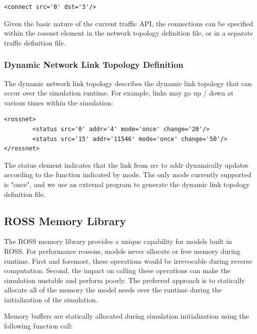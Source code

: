 \documentclass[12pt]{article}
\begin{document}
\begin{small}
\begin{verbatim}
<connect src='0' dst='3'/>
\end{verbatim}
\end{small}

Given the basic nature of the current traffic API, the connections can be
specified within the rossnet element in the network topology definition file,
or in a separate traffic definition file.

\subsubsection{Dynamic Network Link Topology Definition}

The dynamic network link topology describes the dynamic link topology that can
occur over the simulation runtime.  For example, links may go up / down at
various times within the simulation:

\begin{small}
\begin{verbatim}
<rossnet>
        <status src='0' addr='4' mode='once' change='20'/>
        <status src='15' addr='11546' mode='once' change='50'/>
</rossnet>
\end{verbatim}
\end{small}

The status element indicates that the link from src to addr dynamically
updates according to the function indicated by mode.  The only mode currently
supported is "once", and we use an external program to generate the dynamic
link topology definition file.

\subsection{ROSS Memory Library}
\label{ross-memory}

The ROSS memory library provides a unique capability for models built in
ROSS. For performance reasons, models never allocate or free memory during
runtime.  First and foremost, these operations would be irrevocable during
reverse computation.  Second, the impact on calling these operations can make
the simulation unstable and perform poorly.  The preferred approach is to
statically allocate all of the memory the model needs over the runtime during
the initialization of the simulation.

Memory buffers are statically allocated during simulation initialization using
the following function call:
\end{document}
